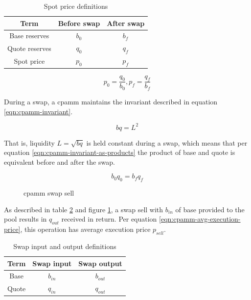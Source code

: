 \documentclass[table, twocolumn]{article}
\begin{document}
\begin{table}[!htb]
  \centering
  \begin{tabular}{|c|c|c|}
    \hline \rowcolor{blue}
    Term           & Before swap & After swap \\ \hline
    Base reserves  & $b_0$       & $b_f$      \\ \hline
    Quote reserves & $q_0$       & $q_f$      \\ \hline
    Spot price     & $p_0$       & $p_f$      \\ \hline
  \end{tabular}
  \caption{Spot price definitions}
  \label{tab:spot-before-after-swap}
\end{table}

\begin{equation} \label{eqn:price-before-after}
  p_0 = \frac{q_0}{b_0},
  p_f = \frac{q_f}{b_f}
\end{equation}

During a swap, a \gls{cpamm} maintains the invariant described in equation
\ref{eqn:cpamm-invariant}.

\begin{equation} \label{eqn:cpamm-invariant}
  b q = L^2
\end{equation}

That is, liquidity $L = \sqrt{bq}$ is held constant during a swap, which means that per equation
\ref{eqn:cpamm-invariant-as-products} the product of base and quote is equivalent before and after
the swap.

\begin{equation} \label{eqn:cpamm-invariant-as-products}
  b_0 q_0 = b_f q_f
\end{equation}

\begin{figure}[!htb]
  \centering
  
  \caption{\gls{cpamm} swap sell}
  \label{fig:cpamm-swap-sell}
\end{figure}

As described in table \ref{tab:swap-in-out} and figure \ref{fig:cpamm-swap-sell}, a swap sell with
$b_{in}$ of base provided to the pool results in $q_{out}$ received in return. Per equation
\ref{eqn:cpamm-avg-execution-price}, this operation has average execution price $p_{sell}$.

\begin{table}[!htb]
  \centering
  \begin{tabular}{|c|c|c|}
    \hline \rowcolor{blue}
    Term  & Swap input & Swap output \\ \hline
    Base  & $b_{in}$   & $b_{out}$   \\ \hline
    Quote & $q_{in}$   & $q_{out}$   \\ \hline
  \end{tabular}
  \caption{Swap input and output definitions}
  \label{tab:swap-in-out}
\end{table}
\end{document}
